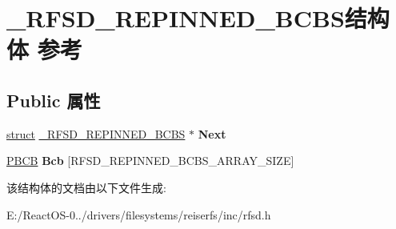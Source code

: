 \hypertarget{struct___r_f_s_d___r_e_p_i_n_n_e_d___b_c_b_s}{}\section{\+\_\+\+R\+F\+S\+D\+\_\+\+R\+E\+P\+I\+N\+N\+E\+D\+\_\+\+B\+C\+B\+S结构体 参考}
\label{struct___r_f_s_d___r_e_p_i_n_n_e_d___b_c_b_s}
\subsection*{Public 属性}
\begin{DoxyCompactItemize}
\item 
\mbox{\label{struct___r_f_s_d___r_e_p_i_n_n_e_d___b_c_b_s_aedc141a657a65c0a2da5c588358b3175}} 
\hyperlink{interfacestruct}{struct} \hyperlink{struct___r_f_s_d___r_e_p_i_n_n_e_d___b_c_b_s}{\+\_\+\+R\+F\+S\+D\+\_\+\+R\+E\+P\+I\+N\+N\+E\+D\+\_\+\+B\+C\+BS} $\ast$ {\bfseries Next}
\item 
\mbox{\label{struct___r_f_s_d___r_e_p_i_n_n_e_d___b_c_b_s_a9a072dda5168c6b79ebd01b41335884b}} 
\hyperlink{interfacevoid}{P\+B\+CB} {\bfseries Bcb} \mbox{[}R\+F\+S\+D\+\_\+\+R\+E\+P\+I\+N\+N\+E\+D\+\_\+\+B\+C\+B\+S\+\_\+\+A\+R\+R\+A\+Y\+\_\+\+S\+I\+ZE\mbox{]}
\end{DoxyCompactItemize}


该结构体的文档由以下文件生成\+:\begin{DoxyCompactItemize}
\item 
E\+:/\+React\+O\+S-\/0../drivers/filesystems/reiserfs/inc/rfsd.\+h\end{DoxyCompactItemize}
